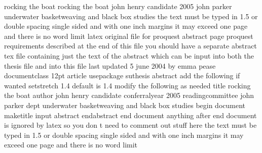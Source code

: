 rocking the boat rocking the boat john henry candidate 2005 john parker underwater basketweaving and black box studies the text must be typed in 1.5 or double spacing single sided and with one inch margins it may exceed one page and there is no word limit latex original file for proquest abstract page proquest requirements described at the end of this file you should have a separate abstract tex file containing just the text of the abstract which can be input into both the thesis file and into this file last updated 5 june 2004 by emma pease documentclass 12pt article usepackage suthesis abstract add the following if wanted setstretch 1.4 default is 1.4 modify the following as needed title rocking the boat author john henry candidate conferralyear 2005 readingcommittee john parker dept underwater basketweaving and black box studies begin document maketitle input abstract endabstract end document anything after end document is ignored by latex so you don t need to comment out stuff here the text must be typed in 1.5 or double spacing single sided and with one inch margins it may exceed one page and there is no word limit
